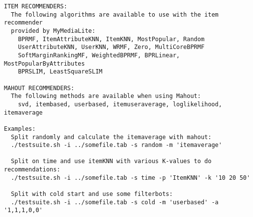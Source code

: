 \begin{lstlisting}
ITEM RECOMMENDERS:
  The following algorithms are available to use with the item recommender
  provided by MyMediaLite:
    BPRMF, ItemAttributeKNN, ItemKNN, MostPopular, Random
    UserAttributeKNN, UserKNN, WRMF, Zero, MultiCoreBPRMF
    SoftMarginRankingMF, WeightedBPRMF, BPRLinear, MostPopularByAttributes
    BPRSLIM, LeastSquareSLIM

MAHOUT RECOMMENDERS:
  The following methods are available when using Mahout:
    svd, itembased, userbased, itemuseraverage, loglikelihood, itemaverage

Examples:
  Split randomly and calculate the itemaverage with mahout:
  ./testsuite.sh -i ../somefile.tab -s random -m 'itemaverage'

  Split on time and use itemKNN with various K-values to do recommendations:
  ./testsuite.sh -i ../somefile.tab -s time -p 'ItemKNN' -k '10 20 50'

  Split with cold start and use some filterbots:
  ./testsuite.sh -i ../somefile.tab -s cold -m 'userbased' -a '1,1,1,0,0'
\end{lstlisting}
